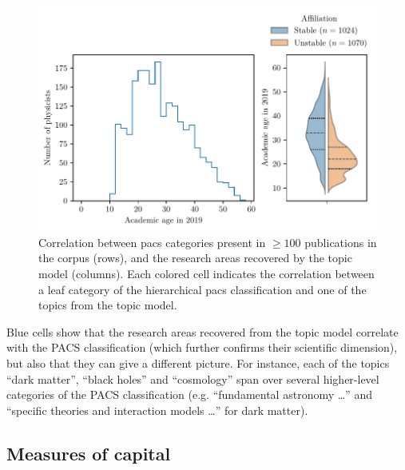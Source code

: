 \documentclass{article}
\begin{document}
\begin{figure}[H]
    \centering
    \includegraphics[height=0.72\paperheight
]{Fig11}
    \caption{Correlation between \gls{pacs} categories present in $\geq 100$ publications in the corpus (rows), and the research areas recovered by the topic model (columns). Each colored cell indicates the correlation between a leaf category of the hierarchical \gls{pacs} classification and one of the topics from the topic model.}
\end{figure}

Blue cells show that the research areas recovered from the topic model correlate with the PACS classification (which further confirms their scientific dimension), but also that they can give a different picture. For instance, each of the topics  ``dark matter'', ``black holes'' and ``cosmology'' span over several higher-level categories of the PACS classification (e.g. ``fundamental astronomy \dots'' and ``specific theories and interaction models \dots'' for dark matter).


\subsection{\label{appendix:capital_validation}Measures of capital}
\end{document}
